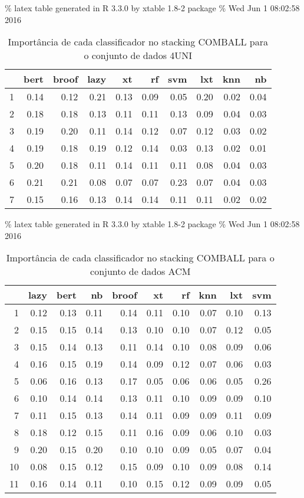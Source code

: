 \documentclass[]{article}
\begin{document}
\% latex table generated in R 3.3.0 by xtable 1.8-2 package \% Wed Jun 1
08:02:58 2016

\begin{table}[ht]
\centering
\begin{tabular}{rrrrrrrrrr}
  \hline
 & bert & broof & lazy & xt & rf & svm & lxt & knn & nb \\ 
  \hline
1 & 0.14 & 0.12 & 0.21 & 0.13 & 0.09 & 0.05 & 0.20 & 0.02 & 0.04 \\ 
  2 & 0.18 & 0.18 & 0.13 & 0.11 & 0.11 & 0.13 & 0.09 & 0.04 & 0.03 \\ 
  3 & 0.19 & 0.20 & 0.11 & 0.14 & 0.12 & 0.07 & 0.12 & 0.03 & 0.02 \\ 
  4 & 0.19 & 0.18 & 0.19 & 0.12 & 0.14 & 0.03 & 0.13 & 0.02 & 0.01 \\ 
  5 & 0.20 & 0.18 & 0.11 & 0.14 & 0.11 & 0.11 & 0.08 & 0.04 & 0.03 \\ 
  6 & 0.21 & 0.21 & 0.08 & 0.07 & 0.07 & 0.23 & 0.07 & 0.04 & 0.03 \\ 
  7 & 0.15 & 0.16 & 0.13 & 0.14 & 0.14 & 0.11 & 0.11 & 0.02 & 0.02 \\ 
   \hline
\end{tabular}
\caption{Importância de cada classificador no stacking COMBALL para o conjunto de dados 4UNI} 
\label{tab:imp4uni}
\end{table}

\% latex table generated in R 3.3.0 by xtable 1.8-2 package \% Wed Jun 1
08:02:58 2016

\begin{table}[ht]
\centering
\begin{tabular}{rrrrrrrrrr}
  \hline
 & lazy & bert & nb & broof & xt & rf & knn & lxt & svm \\ 
  \hline
1 & 0.12 & 0.13 & 0.11 & 0.14 & 0.11 & 0.10 & 0.07 & 0.10 & 0.13 \\ 
  2 & 0.15 & 0.15 & 0.14 & 0.13 & 0.10 & 0.10 & 0.07 & 0.12 & 0.05 \\ 
  3 & 0.15 & 0.14 & 0.13 & 0.11 & 0.14 & 0.10 & 0.08 & 0.09 & 0.06 \\ 
  4 & 0.16 & 0.15 & 0.19 & 0.14 & 0.09 & 0.12 & 0.07 & 0.06 & 0.03 \\ 
  5 & 0.06 & 0.16 & 0.13 & 0.17 & 0.05 & 0.06 & 0.06 & 0.05 & 0.26 \\ 
  6 & 0.10 & 0.14 & 0.14 & 0.13 & 0.11 & 0.10 & 0.09 & 0.09 & 0.10 \\ 
  7 & 0.11 & 0.15 & 0.13 & 0.14 & 0.11 & 0.09 & 0.09 & 0.11 & 0.09 \\ 
  8 & 0.18 & 0.12 & 0.15 & 0.11 & 0.16 & 0.09 & 0.06 & 0.10 & 0.03 \\ 
  9 & 0.20 & 0.15 & 0.20 & 0.10 & 0.10 & 0.09 & 0.05 & 0.07 & 0.04 \\ 
  10 & 0.08 & 0.15 & 0.12 & 0.15 & 0.09 & 0.10 & 0.09 & 0.08 & 0.14 \\ 
  11 & 0.16 & 0.14 & 0.11 & 0.10 & 0.15 & 0.12 & 0.09 & 0.09 & 0.05 \\ 
   \hline
\end{tabular}
\caption{Importância de cada classificador no stacking COMBALL para o conjunto de dados ACM} 
\label{tab:impacm}
\end{table}
\end{document}
